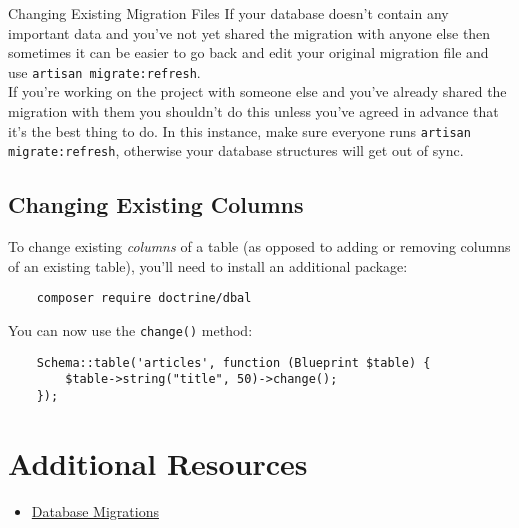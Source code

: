 \pagebreak

\begin{infobox}{Changing Existing Migration Files}
    If your database doesn't contain any important data and you've not yet shared the migration with anyone else then sometimes it can be easier to go back and edit your original migration file and use \texttt{artisan migrate:refresh}.
    \\

    If you're working on the project with someone else and you've already shared the migration with them you shouldn't do this unless you've agreed in advance that it's the best thing to do. In this instance, make sure everyone runs \texttt{artisan migrate:refresh}, otherwise your database structures will get out of sync.
\end{infobox}


\subsection{Changing Existing Columns}

To change existing \textit{columns} of a table (as opposed to adding or removing columns of an existing table), you'll need to install an additional package:

\begin{verbatim}
    composer require doctrine/dbal
\end{verbatim}

You can now use the \texttt{change()} method:

\begin{verbatim}
    Schema::table('articles', function (Blueprint $table) {
        $table->string("title", 50)->change();
    });
\end{verbatim}



\section{Additional Resources}

\begin{itemize}[leftmargin=*]
    \item \href{http://laravel.com/docs/master/migrations}{Database Migrations}
\end{itemize}
